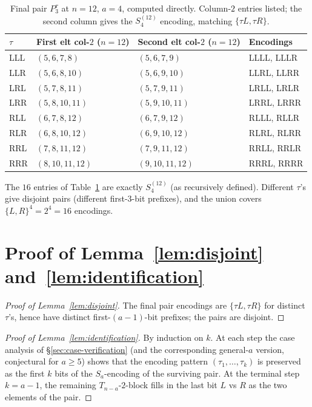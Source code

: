 \documentclass[11pt]{article}
\theoremstyle{definition}
\begin{document}
\begin{table}[h]
\caption{Final pair $P_3^\tau$ at $n=12$, $a=4$, computed directly.
Column-$2$ entries listed; the second column gives the $S_4^{(12)}$
encoding, matching $\{\tau L,\tau R\}$.}
\label{tab:P3-verified}
\centering
\small
\begin{tabular}{llll}
\toprule
$\tau$ & First elt col-$2$ ($n=12$) & Second elt col-$2$ ($n=12$) & Encodings \\
\midrule
LLL & $(5,6,7,8)$ & $(5,6,7,9)$ & LLLL, LLLR \\
LLR & $(5,6,8,10)$ & $(5,6,9,10)$ & LLRL, LLRR \\
LRL & $(5,7,8,11)$ & $(5,7,9,11)$ & LRLL, LRLR \\
LRR & $(5,8,10,11)$ & $(5,9,10,11)$ & LRRL, LRRR \\
RLL & $(6,7,8,12)$ & $(6,7,9,12)$ & RLLL, RLLR \\
RLR & $(6,8,10,12)$ & $(6,9,10,12)$ & RLRL, RLRR \\
RRL & $(7,8,11,12)$ & $(7,9,11,12)$ & RRLL, RRLR \\
RRR & $(8,10,11,12)$ & $(9,10,11,12)$ & RRRL, RRRR \\
\bottomrule
\end{tabular}
\end{table}

The $16$ entries of Table~\ref{tab:P3-verified} are exactly
$S_4^{(12)}$ (as recursively defined).  Different $\tau$'s give
disjoint pairs (different first-$3$-bit prefixes), and the union
covers $\{L,R\}^4=2^4=16$ encodings.

\section{Proof of Lemma~\ref{lem:disjoint} and~\ref{lem:identification}}

\begin{proof}[Proof of Lemma~\ref{lem:disjoint}]
The final pair encodings are $\{\tau L,\tau R\}$ for distinct $\tau$'s,
hence have distinct first-$(a-1)$-bit prefixes; the pairs are
disjoint.
\end{proof}

\begin{proof}[Proof of Lemma~\ref{lem:identification}]
By induction on $k$.  At each step the case analysis of
\S\ref{sec:case-verification} (and the corresponding general-$a$
version, conjectural for $a\ge 5$) shows that the encoding pattern
$(\tau_1,\ldots,\tau_k)$ is preserved as the first $k$ bits of the
$S_a$-encoding of the surviving pair.  At the terminal step $k=a-1$,
the remaining $T_{n-a}$-$2$-block fills in the last bit $L$ vs $R$
as the two elements of the pair.
\end{proof}
\end{document}
